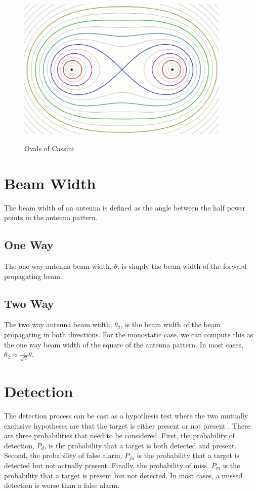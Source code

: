\begin{figure}[H]
  \begin{center}
\includegraphics[width=4in]{../media/multistatic/ovals_of_cassini.png}
  \end{center}
  \renewcommand{\baselinestretch}{1} \small\normalsize
  \begin{quote}
    \caption[Ovals of Cassini]{Ovals of Cassini\label{intro_fig:3}}
  \end{quote}
\end{figure}
\renewcommand{\baselinestretch}{2} \small\normalsize
\section{Beam Width}
The beam width of an antenna is defined as the angle between the half power points in the antenna pattern.

\subsection{One Way}
The one way antenna beam width, $\theta$, is simply the beam width of the forward propagating beam.

\subsection{Two Way}
The two way antenna beam width, $\theta_2$, is the beam width of the beam propagating in both directions. For the monostatic case, we can compute this as the one way beam width of the square of the antenna pattern. In most cases, $\theta_2 \approx \frac{1}{\sqrt{2}}\theta$.

\section{Detection}
The detection process can be cast as a hypothesis test where the two mutually exclusive hypotheses are that the target is either present or not present \cite{richards_radar}. There are three probabilities that need to be considered. First, the probability of detection, $P_d$, is the probability that a target is both detected and present. Second, the probability of false alarm, $P_{fa}$ is the probability that a target is detected but not actually present. Finally, the probability of miss, $P_m$ is the probability that a target is present but not detected. In most cases, a missed detection is worse than a false alarm.

